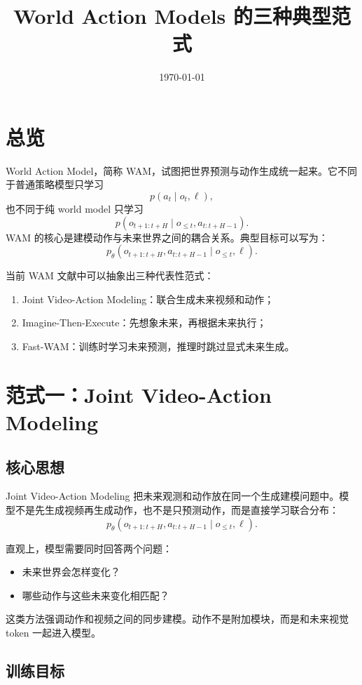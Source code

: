 \documentclass[11pt,a4paper]{ctexart}
\title{World Action Models 的三种典型范式}
\author{}
\date{\today}
\begin{document}
\maketitle

\section{总览}

World Action Model，简称 WAM，试图把世界预测与动作生成统一起来。它不同于普通策略模型只学习
\[
  p(a_t\mid o_t,\ell),
\]
也不同于纯 world model 只学习
\[
  p(o_{t+1:t+H}\mid o_{\le t},a_{t:t+H-1}).
\]
WAM 的核心是建模动作与未来世界之间的耦合关系。典型目标可以写为：
\[
  p_\theta(o_{t+1:t+H},a_{t:t+H-1}\mid o_{\le t},\ell).
\]

当前 WAM 文献中可以抽象出三种代表性范式：
\begin{enumerate}
  \item Joint Video-Action Modeling：联合生成未来视频和动作；
  \item Imagine-Then-Execute：先想象未来，再根据未来执行；
  \item Fast-WAM：训练时学习未来预测，推理时跳过显式未来生成。
\end{enumerate}

\section{范式一：Joint Video-Action Modeling}

\subsection{核心思想}

Joint Video-Action Modeling 把未来观测和动作放在同一个生成建模问题中。模型不是先生成视频再生成动作，也不是只预测动作，而是直接学习联合分布：
\[
  p_\theta(o_{t+1:t+H},a_{t:t+H-1}\mid o_{\le t},\ell).
\]

直观上，模型需要同时回答两个问题：
\begin{itemize}
  \item 未来世界会怎样变化？
  \item 哪些动作与这些未来变化相匹配？
\end{itemize}

这类方法强调动作和视频之间的同步建模。动作不是附加模块，而是和未来视觉 token 一起进入模型。

\subsection{训练目标}
\end{document}
